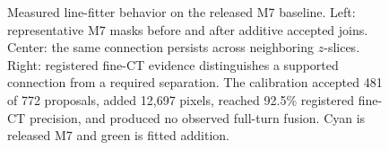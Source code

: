 \begin{figure}[t]
  \centering
  \caption{Measured line-fitter behavior on the released M7 baseline. Left:
  representative M7 masks before and after additive accepted joins. Center:
  the same connection persists across neighboring $z$-slices. Right:
  registered fine-CT evidence distinguishes a supported connection from a
  required separation. The calibration accepted 481 of 772 proposals, added
  12,697 pixels, reached 92.5\% registered fine-CT precision, and produced no
  observed full-turn fusion. Cyan is released M7 and green is fitted addition.}
  \label{fig:fitter}
\end{figure}
